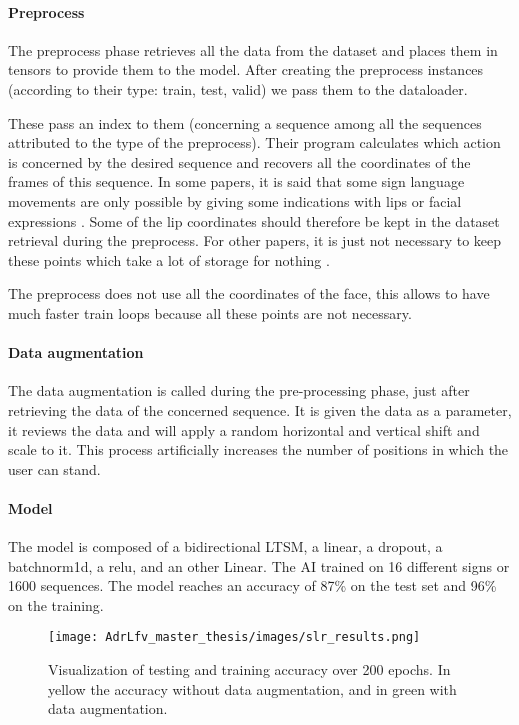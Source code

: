 \paragraph{Preprocess}

The preprocess phase retrieves all the data from the dataset and places them in tensors to provide them to the model.
After creating the preprocess instances (according to their type: train, test, valid) we pass them to the dataloader. 

These pass an index to them (concerning a sequence among all the sequences attributed to the type of the preprocess). Their program calculates which action is concerned by the desired sequence and recovers all the coordinates of the frames of this sequence. 
In some papers, it is said that some sign language movements are only possible by giving some indications with lips or facial expressions \cite{cooper2011sign}. Some of the lip coordinates should therefore be kept in the dataset retrieval during the preprocess. For other papers, it is just not necessary to keep these points which take a lot of storage for nothing \cite{dreuw2007speech}.

The preprocess does not use all the coordinates of the face, this allows to have much faster train loops because all these points are not necessary.

\paragraph{Data augmentation}

The data augmentation is called during the pre-processing phase, just after retrieving the data of the concerned sequence. It is given the data as a parameter, it reviews the data and will apply a random horizontal and vertical shift and scale to it. This process artificially increases the number of positions in which the user can stand.

\paragraph{Model}

The model is composed of a bidirectional LTSM, a linear, a dropout, a batchnorm1d, a relu, and an other Linear. The AI trained on 16 different signs or 1600 sequences. The model reaches an accuracy of 87\% on the test set and 96\% on the training.

\begin{figure}[h]
    \centering
    \texttt{[image: AdrLfv\_master\_thesis/images/slr\_results.png]}
    \caption{Visualization of testing and training accuracy over 200 epochs. In yellow the accuracy without data augmentation, and in green with data augmentation.}
    \label{fig:slr_results}
\end{figure}

